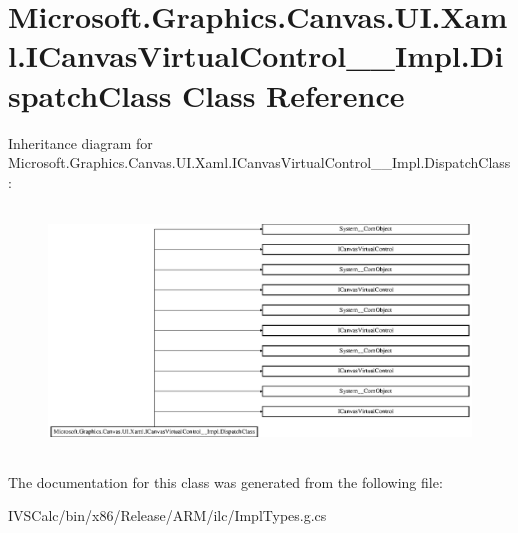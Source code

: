 \hypertarget{class_microsoft_1_1_graphics_1_1_canvas_1_1_u_i_1_1_xaml_1_1_i_canvas_virtual_control_____impl_1_1_dispatch_class}{}\section{Microsoft.\+Graphics.\+Canvas.\+U\+I.\+Xaml.\+I\+Canvas\+Virtual\+Control\+\_\+\+\_\+\+Impl.\+Dispatch\+Class Class Reference}
\label{class_microsoft_1_1_graphics_1_1_canvas_1_1_u_i_1_1_xaml_1_1_i_canvas_virtual_control_____impl_1_1_dispatch_class}
Inheritance diagram for Microsoft.\+Graphics.\+Canvas.\+U\+I.\+Xaml.\+I\+Canvas\+Virtual\+Control\+\_\+\+\_\+\+Impl.\+Dispatch\+Class\+:\begin{figure}[H]
\begin{center}
\leavevmode
\includegraphics[height=6.553191cm]{class_microsoft_1_1_graphics_1_1_canvas_1_1_u_i_1_1_xaml_1_1_i_canvas_virtual_control_____impl_1_1_dispatch_class}
\end{center}
\end{figure}


The documentation for this class was generated from the following file\+:\begin{DoxyCompactItemize}
\item 
I\+V\+S\+Calc/bin/x86/\+Release/\+A\+R\+M/ilc/Impl\+Types.\+g.\+cs\end{DoxyCompactItemize}

